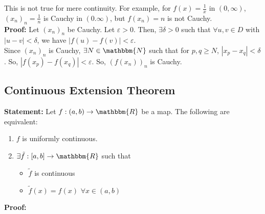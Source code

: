 \documentclass[10pt]{extarticle}
\newcommand{\N}{\mathbbm{N}}
\newcommand{\R}{\mathbbm{R}}
\begin{document}
    This is not true for mere continuity. For example, for  $f(x) = \frac{1}{x}$ in $(0,\infty)$, $(x_n)_n = \frac{1}{n}$ is Cauchy in $(0.\infty)$, but $f(x_n) = n$ is not Cauchy.\\

    \textbf{Proof:} Let $(x_n)_n$ be Cauchy. Let $\varepsilon > 0$. Then, $\exists \delta > 0$ such that $\forall u,v\in D$ with $|u-v| < \delta$, we have $|f(u) - f(v)| < \varepsilon$.\\

    Since $(x_n)_n$ is Cauchy, $\exists N\in \N$ such that for $p,q \geq N$, $|x_p - x_q| < \delta$. So, $|f(x_p) - f(x_q)| < \varepsilon$. So, $\left(f(x_n)\right)_n$ is Cauchy.
  \subsection{Continuous Extension Theorem}%
    \textbf{Statement:} Let $f: (a,b) \rightarrow \R$ be a map. The following are equivalent:
    \begin{enumerate}[(1)]
      \item $f$ is uniformly continuous.
      \item $\exists \tilde{f}: [a,b] \rightarrow \R$ such that
        \begin{itemize}
          \item $\tilde{f}$ is continuous
          \item $\tilde{f}(x) = f(x)$ $\forall x\in (a,b)$
        \end{itemize}
    \end{enumerate}
    \textbf{Proof:}
\end{document}
